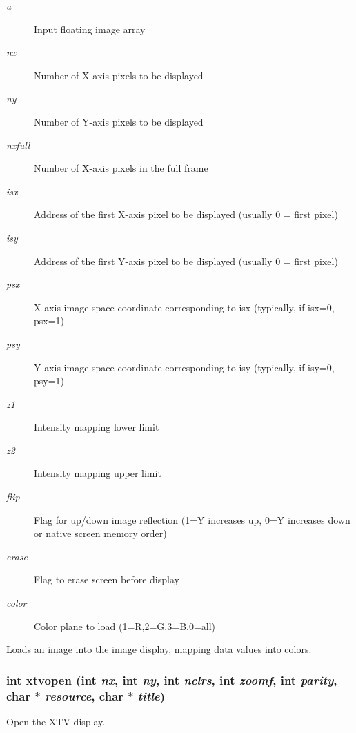 \begin{Desc}
\item[Parameters:]
\begin{description}
\item[{\em a}]Input floating image array \item[{\em nx}]Number of X-axis pixels to be displayed \item[{\em ny}]Number of Y-axis pixels to be displayed \item[{\em nxfull}]Number of X-axis pixels in the full frame \item[{\em isx}]Address of the first X-axis pixel to be displayed (usually 0 = first pixel) \item[{\em isy}]Address of the first Y-axis pixel to be displayed (usually 0 = first pixel) \item[{\em psx}]X-axis image-space coordinate corresponding to isx (typically, if isx=0, psx=1) \item[{\em psy}]Y-axis image-space coordinate corresponding to isy (typically, if isy=0, psy=1) \item[{\em z1}]Intensity mapping lower limit \item[{\em z2}]Intensity mapping upper limit \item[{\em flip}]Flag for up/down image reflection (1=Y increases up, 0=Y increases down or native screen memory order) \item[{\em erase}]Flag to erase screen before display \item[{\em color}]Color plane to load (1=R,2=G,3=B,0=all)\end{description}
\end{Desc}
Loads an image into the image display, mapping data values into colors. 
\subsubsection{\setlength{\rightskip}{0pt plus 5cm}int xtvopen (int {\em nx}, int {\em ny}, int {\em nclrs}, int {\em zoomf}, int {\em parity}, char $\ast$ {\em resource}, char $\ast$ {\em title})}\label{xtv_8h_a126}


Open the XTV display. 

